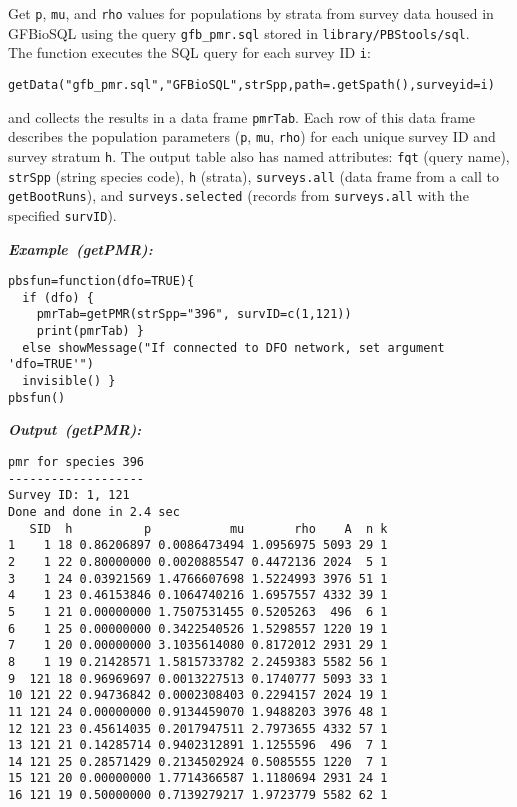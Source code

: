 \documentclass[letterpaper,12pt,fleqn]{article}
\def\tab{\hspace{0.5 in}}
\newcommand{\code}[1]{\small\texttt{#1}\normalsize}
\newcommand{\db}[1]{\small\textmd{\textsf{#1}}\normalsize}
\newcommand\example[1]{    %
	\textbf{\emph{Example~(#1):}}\\ \vspace{3 pt}
}
\newcommand\results[1]{    %
	\textbf{\emph{Output~(#1):}}\\ \vspace{3 pt}
}
\begin{document}
\tab Get \code{p}, \code{mu}, and \code{rho} values for populations by strata from survey data housed in \db{GFBioSQL} using the query \code{gfb\_pmr.sql} stored in \code{library/PBStools/sql}.\\ 
The function executes the SQL query for each survey ID \code{i}:
\begin{Verbatim}[fontsize=\footnotesize]
getData("gfb_pmr.sql","GFBioSQL",strSpp,path=.getSpath(),surveyid=i)
\end{Verbatim}
and collects the results in a data frame \code{pmrTab}. Each row of this data frame describes the population parameters (\code{p}, \code{mu}, \code{rho}) for each unique survey ID and survey stratum \code{h}. The output table also has named attributes: \code{fqt} (query name), \code{strSpp} (string species code), \code{h} (strata), \code{surveys.all} (data frame from a call to \code{getBootRuns}), and \code{surveys.selected} (records from \code{surveys.all} with the specified \code{survID}).

\begin{examplebox}
\example{getPMR}
\begin{Verbatim}[fontsize=\footnotesize]
pbsfun=function(dfo=TRUE){
  if (dfo) {
    pmrTab=getPMR(strSpp="396", survID=c(1,121))
    print(pmrTab) }
  else showMessage("If connected to DFO network, set argument 'dfo=TRUE'")
  invisible() }
pbsfun()
\end{Verbatim}
\end{examplebox}

\begin{outputbox}
\results{getPMR}
\begin{Verbatim}[fontsize=\footnotesize]
pmr for species 396
-------------------
Survey ID: 1, 121
Done and done in 2.4 sec
   SID  h          p           mu       rho    A  n k
1    1 18 0.86206897 0.0086473494 1.0956975 5093 29 1
2    1 22 0.80000000 0.0020885547 0.4472136 2024  5 1
3    1 24 0.03921569 1.4766607698 1.5224993 3976 51 1
4    1 23 0.46153846 0.1064740216 1.6957557 4332 39 1
5    1 21 0.00000000 1.7507531455 0.5205263  496  6 1
6    1 25 0.00000000 0.3422540526 1.5298557 1220 19 1
7    1 20 0.00000000 3.1035614080 0.8172012 2931 29 1
8    1 19 0.21428571 1.5815733782 2.2459383 5582 56 1
9  121 18 0.96969697 0.0013227513 0.1740777 5093 33 1
10 121 22 0.94736842 0.0002308403 0.2294157 2024 19 1
11 121 24 0.00000000 0.9134459070 1.9488203 3976 48 1
12 121 23 0.45614035 0.2017947511 2.7973655 4332 57 1
13 121 21 0.14285714 0.9402312891 1.1255596  496  7 1
14 121 25 0.28571429 0.2134502924 0.5085555 1220  7 1
15 121 20 0.00000000 1.7714366587 1.1180694 2931 24 1
16 121 19 0.50000000 0.7139279217 1.9723779 5582 62 1
\end{Verbatim}
\end{outputbox}
\end{document}
